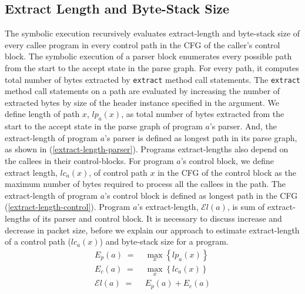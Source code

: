 \subsection{Extract Length and Byte-Stack Size}
\label{subsection:wxtract-length and Byte-Stack Size}
The symbolic execution recursively evaluates extract-length and byte-stack size of every callee program in every control path in the CFG of the caller's control block.
The symbolic execution of a parser block enumerates every possible path from the start to the accept state in the parse graph.
For every path, it computes total number of bytes extracted by \texttt{extract} method call statements.
The \texttt{extract} method call statements on a path are evaluated by increasing the number of extracted bytes by size of the header instance specified in the argument.
We define length of path $x$, $lp_{a}(x)$,  as total number of bytes extracted from the start to the accept state in the parse graph of program $a$'s parser.
And, the extract-length of program $a$'s parser is defined as longest path in its parse graph, as shown in (\ref{extract-length-parser}).
Programs extract-lengths also depend on the callees in their control-blocks.
For program $a$'s control block, we define extract length, $lc_{a}(x)$, of control path $x$ in the CFG of the control block as the maximum number of bytes required to process all the callees in the path.
The extract-length of program $a$'s control block is defined as longest path in the CFG (\ref{extract-length-control}).
Program $a$'s extract-length, $\mathcal{E}l(a)$, is sum of extract-lengths of its parser and control block.
It is necessary to discuss increase and decrease in packet size, before we explain our approach to estimate extract-length of a control path ($lc_{a}(x)$) and byte-stack size for a program.
\begin{align}
E_{p}(a)\; =& \; \max_{x}\left\{lp_{a}(x)\right\} \label{extract-length-parser} \\
E_{c}(a)\; =& \; \max_{x}\left\{lc_{a}(x)\right\} \label{extract-length-control} \\
\mathcal{E}l(a)\; =& \; E_{p}(a) + E_{c}(a) \label{extract-length-program}
\end{align}



